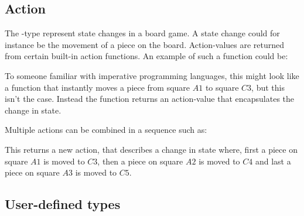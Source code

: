 
\subsection{Action}

The -type represent state changes in a board game. A state change could for instance be the movement
of a piece on the board. Action-values are returned from certain built-in action functions. An example
of such a function could be:


To someone familiar with imperative programming languages, this might look like a function that
instantly moves a piece from square $A1$ to square $C3$, but this isn't the case. Instead the
function returns an action-value that encapsulates the change in state.

Multiple actions can be combined in a sequence such as:


This returns a new action, that describes a change in state where, first a piece on square $A1$
is moved to $C3$, then a piece on square $A2$ is moved to $C4$ and last a piece on square $A3$
is moved to $C5$.

\subsection{User-defined types}

